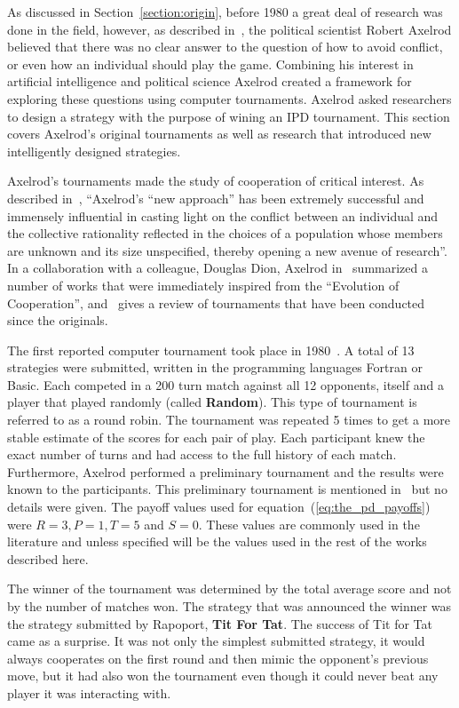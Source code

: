 \documentclass{article}
\theoremstyle{definition}
\begin{document}
As discussed in Section~\ref{section:origin}, before 1980 a great deal of
research was done in the field, however, as described in~\cite{Axelrod2012}, the
political scientist Robert Axelrod believed that there was no clear answer to the
question of how to avoid conflict, or even how an individual should play the
game. Combining his interest in artificial intelligence and political science
Axelrod created a framework for exploring these questions using computer
tournaments. Axelrod asked researchers to design a strategy with the purpose of
wining an IPD tournament. This section covers Axelrod's original
tournaments as well as research that introduced new intelligently designed
strategies.

Axelrod's tournaments made the study of cooperation of critical interest. As
described in~\cite{Rapoport2015}, ``Axelrod's “new approach” has been extremely
successful and immensely influential in casting light on the conflict between an
individual and the collective rationality reflected in the choices of a
population whose members are unknown and its size unspecified, thereby opening a
new avenue of research''. In a collaboration with a colleague, Douglas Dion,
Axelrod in~\cite{Axelrod1988} summarized a number of works that were immediately
inspired from the ``Evolution of Cooperation'', and~\cite{Jurisic2012} gives a
review of tournaments that have been conducted since the originals.

The first reported computer tournament took place in 1980~\cite{Axelrod1980a}. A
total of 13 strategies were submitted, written in the programming languages
Fortran or Basic. Each competed in a 200 turn match against all 12 opponents,
itself and a player that played randomly (called \textbf{Random}). This type of
tournament is referred to as a round robin. The tournament was repeated 5 times
to get a more stable estimate of the scores for each pair of play.
Each participant knew the exact number of turns and had access to the full
history of each match. Furthermore, Axelrod performed a preliminary tournament
and the results were known to the participants. This preliminary tournament is
mentioned in~\cite{Axelrod1980a} but no details were given. The payoff values
used for equation~(\ref{eq:the_pd_payoffs}) were \(R=3, P=1, T=5\) and \(S=0\).
These values are commonly used in the literature and unless specified will be
the values used in the rest of the works described here.

The winner of the tournament was determined by the total average score and not
by the number of matches won. The strategy that was announced the winner was the
strategy submitted by Rapoport, \textbf{Tit For Tat}. The success of Tit for Tat
came as a surprise. It was not only the simplest submitted strategy, it would
always cooperates on the first round and then mimic the opponent's previous
move, but it had also won the tournament even though it could never beat
any player it was interacting with.
\end{document}
